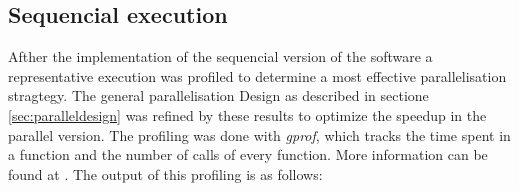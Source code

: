 \subsection{Sequencial execution}
\label{sec:seq_ex}
Afther the implementation of the sequencial version of the software a representative execution was profiled to determine a most effective parallelisation stragtegy. The general parallelisation Design as described in sectione \ref{sec:paralleldesign} was refined by these results to optimize the speedup in the parallel version.
The profiling was done with \emph{gprof}, which tracks the time spent in a function and the number of calls of every function. More information can be found at \cite{gprof}.
The output of this profiling is as follows:


